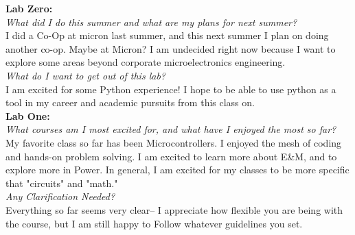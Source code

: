 \textbf{Lab Zero:\\}
\textit{What did I do this summer and what are my plans for next summer? \\}
I did a Co-Op at micron last summer, and this next summer I plan on doing another co-op. Maybe at Micron? I am undecided right now because I want to explore some areas beyond corporate microelectronics engineering. \\
\textit{What do I want to get out of this lab?\\}
I am excited for some Python experience! I hope to be able to use python as a tool in my career and academic pursuits from this class on.\\
\textbf{Lab One:\\}
\textit{What courses am I most excited for, and what have I enjoyed the most so far? \\}
My favorite class so far has been Microcontrollers. I enjoyed the mesh of coding and hands-on problem solving. I am excited to learn more about E&M, and to explore more in Power. In general, I am excited for my classes to be more specific that "circuits" and "math."\\
\textit{Any Clarification Needed?  \\}
Everything so far seems very clear-- I appreciate how flexible you are being with the course, but I am still happy to Follow whatever guidelines you set. 

